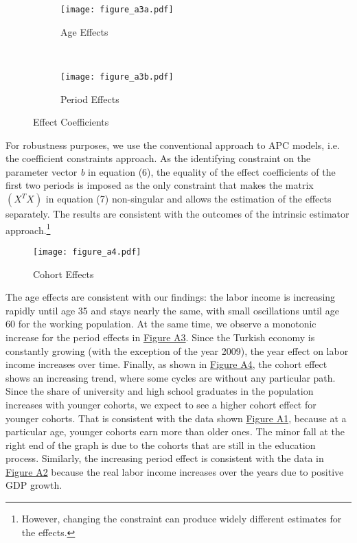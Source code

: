 \documentclass[12pt,author-year]{article}
\begin{document}
\begin{figure}[htb]
	\label{a-figure3}
	\centering
	\begin{subfigure}[b]{0.48\textwidth}
		\texttt{[image: figure\_a3a.pdf]}
		\caption{Age Effects}
	\end{subfigure}
	~
	\begin{subfigure}[b]{0.48\textwidth}
		\texttt{[image: figure\_a3b.pdf]}
		\caption{Period Effects}
	\end{subfigure}    
	\caption{Effect Coefficients}
\end{figure}

For robustness purposes, we use the conventional approach to APC models, i.e. the coefficient constraints approach. As the identifying constraint on the parameter vector \textit{b} in equation (6), the equality of the effect coefficients of the first two periods is imposed as the only constraint that makes the matrix $(X^T X)$ in equation (7) non-singular and allows the estimation of the effects separately. The results are consistent with the outcomes of the intrinsic estimator approach.\footnote{However, changing the constraint can produce widely different estimates for the effects.}

\begin{figure}[htb]
	\label{a-figure4}
	\centering
	\texttt{[image: figure\_a4.pdf]}
	\caption{Cohort Effects}
\end{figure}

The age effects are consistent with our findings: the labor income is increasing rapidly until age 35 and stays nearly the same, with small oscillations until age 60 for the working population. At the same time, we observe a monotonic increase for the period effects in \hyperref[a-figure3]{Figure A3}. Since the Turkish economy is constantly growing (with the exception of the year 2009), the year effect on labor income increases over time. Finally, as shown in \hyperref[a-figure4]{Figure A4}, the cohort effect shows an increasing trend, where some cycles are without any particular path. Since the share of university and high school graduates in the population increases with younger cohorts, we expect to see a higher cohort effect for younger cohorts. That is consistent with the data shown \hyperref[a-figure1]{Figure A1}, because at a particular age, younger cohorts earn more than older ones. The minor fall at the right end of the graph is due to the cohorts that are still in the education process. Similarly, the increasing period effect is consistent with the data in  \hyperref[a-figure2]{Figure A2} because the real labor income increases over the years due to positive GDP growth.
\end{document}
